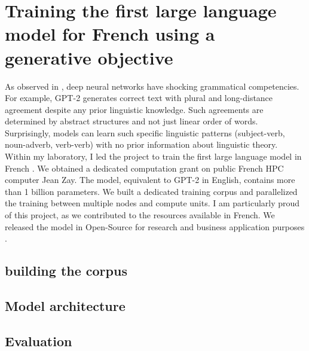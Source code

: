 \setchapterpreamble[u]{\margintoc}
\chapter{Training the first large language model for French using a generative objective}

As observed in \textcite{linzen_2020}, deep neural networks have shocking grammatical competencies. For example, GPT-2 generates correct text with plural and long-distance agreement despite any prior linguistic knowledge. Such agreements are determined by abstract structures and not just linear order of words. Surprisingly, models can learn such specific linguistic patterns (subject-verb, noun-adverb, verb-verb) with no prior information about linguistic theory. Within my laboratory, I led the project to train the first large language model in French \parencite{simoulin_2021c}. We obtained a dedicated computation grant on public French HPC computer Jean Zay. The model, equivalent to GPT-2 in English, contains more than 1 billion parameters. We built a dedicated training corpus and parallelized the training between multiple nodes and compute units. I am particularly proud of this project, as we contributed to the resources available in French. We released the model in Open-Source for research and business application purposes . 

\section{building the corpus}

\section{Model architecture}

\section{Evaluation}
